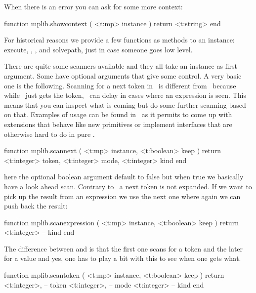 When there is an error you can ask for some more context:

\starttyping[option=LUA]
function mplib.showcontext ( <t:mp> instance )
    return <t:string>
end
\stoptyping

\stopsubsection

\startsubsection[title=Methods]

For historical reasons we provide a few functions as methods to an instance: \typ
{execute}, , ,  and \typ
{solvepath}, just in case someone goes low level.

\stopsubsection

\startsubsection[title=Scanners]

There are quite some scanners available and they all take an instance as first
argument. Some have optional arguments that give some control. A very basic one
is the following. Scanning for a next token in \METAPOST\ is different from \TEX\
because while \TEX\ just gets the token, \METAPOST\ can delay in cases where an
expression is seen. This means that you can inspect what is coming but do some
further scanning based on that. Examples of usage can be found in \CONTEXT\ as it
permits to come up with extensions that behave like new primitives or implement
interfaces that are otherwise hard to do in pure \METAPOST.

\starttyping[option=LUA]
function mplib.scannext ( <t:mp> instance, <t:boolean> keep )
    return <t:integer> token, <t:integer> mode, <t:integer> kind
end
\stoptyping

here the optional  boolean argument default to false but when true we
basically have a look ahead scan. Contrary to \TEX\ a next token is not expanded. If we
want to pick up the result from an expression we use the next one where again we can
push back the result:

\startcolumns[n=4]
\stopcolumns

\starttyping[option=LUA]
function mplib.scanexpression ( <t:mp> instance, <t:boolean> keep )
    return <t:integer> -- kind
end
\stoptyping

The difference between  and  is that the first one
scans for a token and the later for a value and yes, one has to play a bit with
this to see when one gets what.

\starttyping[option=LUA]
function mplib.scantoken ( <t:mp> instance, <t:boolean> keep )
    return
        <t:integer>, -- token
        <t:integer>, -- mode
        <t:integer>  -- kind
end
\stoptyping

